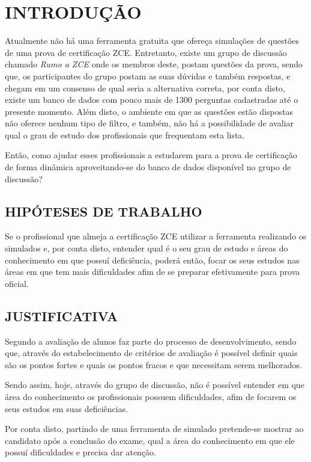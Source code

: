 \chapter{INTRODUÇÃO}
\label{chp:intro}

Atualmente não há uma ferramenta gratuita que ofereça simulações de questões de 
uma prova de certificação \ac{ZCE}. Entretanto, existe um 
grupo de discussão chamado \textit{Rumo a ZCE} onde os membros deste, postam
questões da prova, sendo que, os participantes do grupo postam as suas dúvidas 
e também respostas, e chegam em um consenso de qual seria a alternativa correta,
por conta disto, existe um banco de dados com pouco mais de 1300 perguntas 
cadastradas até o presente momento. Além disto, o ambiente em que as questões 
estão dispostas não oferece nenhum tipo de filtro, e também, não há a 
possibilidade de avaliar qual o grau de estudo dos profissionais que frequentam 
esta lista.

Então, como ajudar esses profissionais a estudarem para a prova de certificação 
de forma dinâmica aproveitando-se do banco de dados disponível no grupo de 
discussão?

\section{HIPÓTESES DE TRABALHO}

Se o profissional que almeja a certificação \acs{ZCE} utilizar a ferramenta
realizando os simulados e, por conta disto, entender qual é o seu grau de estudo e áreas 
do conhecimento em que possuí deficiência, poderá então, focar os seus estudos 
nas áreas em que tem mais dificuldades afim de se preparar efetivamente para 
prova oficial.

\section{JUSTIFICATIVA}

Segundo  a avaliação de  alunos
faz parte do processo de desenvolvimento, sendo que, através do estabelecimento 
de critérios de avaliação é possível definir quais são os pontos fortes e  quais
os pontos fracos e que necessitam serem melhorados.

Sendo assim, hoje, através do grupo de discussão, não é possível entender em 
que área do conhecimento os profissionais possuem dificuldades, afim de focarem
os seus estudos em suas deficiências.

Por conta disto, partindo de uma ferramenta de simulado pretende-se mostrar ao
candidato após a conclusão do exame, qual a área do conhecimento em que ele 
possuí dificuldades e precisa dar atenção.

